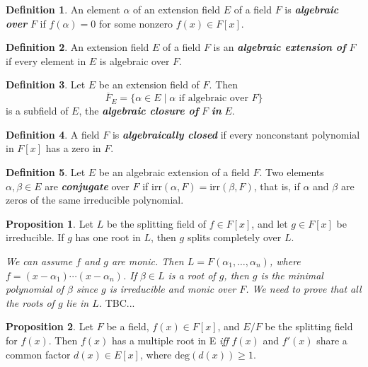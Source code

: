 \documentclass[leqno]{article}
\makeatletter
\theoremstyle{definition}
\newtheorem{prop}{Proposition}
\newtheorem{definition}{Definition}
\theoremstyle{remark}
\let\oldproofname=\proofname
\renewcommand{\proofname}{\textit{\oldproofname}}
\theoremstyle{definition}
\renewenvironment{proof}[1][\proofname]{\par
  \pushQED{\qed}%
  \normalfont \topsep6\p@\@plus6\p@\relax
  \list{}{\leftmargin=0mm
          \rightmargin=0mm
          \settowidth{\itemindent}{\itshape#1}%
          \labelwidth=\itemindent
          \parsep=0pt \listparindent=0mm%
  }
  \item[\hskip\labelsep
        \itshape
    #1\@addpunct{.}]\ignorespaces
}{%
  \popQED\endlist\@endpefalse
}
\makeatother
\begin{document}
    \begin{definition}\label{def:2}
        An element $\alpha$ of an extension field $E$ of a field $F$ is \textbf{\textit{algebraic over}} $F$ if $f(\alpha)=0$ for some nonzero $f(x)\in F[x]$.
    \end{definition}
    \begin{definition}\label{def:3}
        An extension field $E$ of a field $F$ is an \textbf{\textit{algebraic extension of}} $F$ if every element in $E$ is algebraic over $F$.
    \end{definition}
    \begin{definition}\label{def:4}
        Let $E$ be an extension field of $F$. Then
            \begin{equation*}
                \overline{F}_E=\{\alpha\in E\mid \alpha\text{ if algebraic over } F\}
            \end{equation*}
        is a subfield of $E$, the \textbf{\textit{algebraic closure of}} $F$ \textbf{\textit{in}} $E$.
    \end{definition}
    \begin{definition}\label{def:5}
        A field $F$ is \textbf{\textit{algebraically closed}} if every nonconstant polynomial in $F[x]$ has a zero in $F$.
    \end{definition}
    \begin{definition}\label{def:6}
        Let $E$ be an algebraic extension of a field $F$. Two elements $\alpha,\beta\in E$ are \textbf{\textit{conjugate}} over $F$ if irr$(\alpha,F)=$irr$(\beta,F)$, that is, if $\alpha$ and $\beta$ are zeros of the same irreducible polynomial.
    \end{definition}
    \begin{prop}\label{prop:2}
        Let $L$ be the splitting field of $f\in F[x]$, and let $g\in F[x]$ be irreducible. If $g$ has one root in $L$, then $g$ splits completely over $L$.
    \end{prop}
        \begin{proof}
            \emph{We can assume $f$ and $g$ are monic. Then $L=F(\alpha_1,\dots, \alpha_n)$, where $f=(x-\alpha_1)\cdots(x-\alpha_n)$. If $\beta\in L$ is a root of $g$, then $g$ is the minimal polynomial of $\beta$ since $g$ is irreducible and monic over $F$. We need to prove that all the roots of $g$ lie in $L$. }TBC...
        \end{proof}
    \begin{prop}\label{prop:3}
        Let $F$ be a field, $f(x)\in F[x]$, and $E/F$ be the splitting field for $f(x)$. Then $f(x)$ has a multiple root in E \textit{iff} $f(x)$ and $f'(x)$ share a common factor $d(x)\in E[x]$, where $\text{deg}(d(x))\geq 1$. 
    \end{prop}
\end{document}
